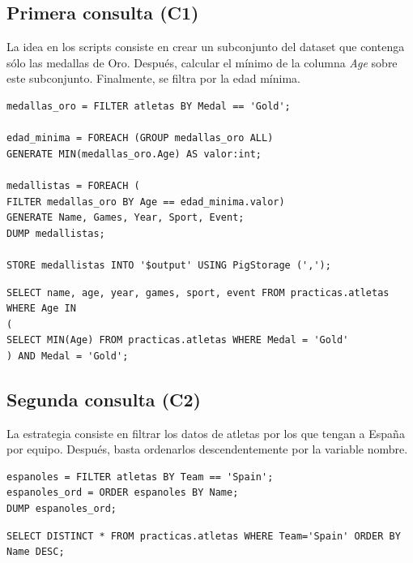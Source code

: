 \subsection*{Primera consulta (C1)}
La idea en los scripts consiste en crear un subconjunto del dataset que contenga sólo las medallas de Oro. Después, calcular el mínimo de la columna \textit{Age} sobre este subconjunto. Finalmente, se filtra por la edad mínima.
\begin{lstlisting}[style=base,caption={C1 para PIG}, label={pig_local_C1}]
medallas_oro = FILTER atletas BY Medal == 'Gold';

edad_minima = FOREACH (GROUP medallas_oro ALL) 
GENERATE MIN(medallas_oro.Age) AS valor:int;

medallistas = FOREACH (
FILTER medallas_oro BY Age == edad_minima.valor)
GENERATE Name, Games, Year, Sport, Event;
DUMP medallistas;

STORE medallistas INTO '$output' USING PigStorage (',');		
\end{lstlisting}

\begin{lstlisting}[style=base,caption={C1 para Hive}, label={pig_hive_C1}]
SELECT name, age, year, games, sport, event FROM practicas.atletas WHERE Age IN 
(
SELECT MIN(Age) FROM practicas.atletas WHERE Medal = 'Gold'
) AND Medal = 'Gold';			
\end{lstlisting}
\subsection*{Segunda consulta (C2)}
La estrategia consiste en filtrar los datos de atletas por los que tengan a España por equipo. Después, basta ordenarlos descendentemente por la variable nombre. 
\begin{lstlisting}[style=base,caption={C2 para Pig}, label={pig_C2}]	
espanoles = FILTER atletas BY Team == 'Spain';
espanoles_ord = ORDER espanoles BY Name;
DUMP espanoles_ord;	
\end{lstlisting}

\begin{lstlisting}[style=base,caption={C2 para Hive}, label={hive_C2}]	
SELECT DISTINCT * FROM practicas.atletas WHERE Team='Spain' ORDER BY Name DESC;
\end{lstlisting}
